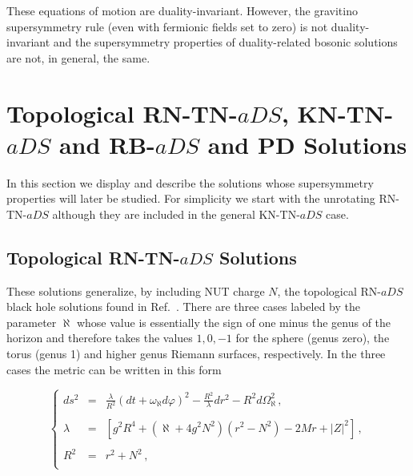 \documentclass[12pt,a4paper]{article}
\begin{document}
These equations of motion are duality-invariant. However, the
gravitino supersymmetry rule (even with fermionic fields set to zero)
is not duality-invariant and the supersymmetry properties of
duality-related bosonic solutions are not, in general, the same.



\section{Topological RN-TN-$aDS$, KN-TN-$aDS$ and 
RB-$aDS$ and PD Solutions}
\label{sec-solutions}

In this section we display and describe the solutions whose
supersymmetry properties will later be studied.  For simplicity we
start with the unrotating RN-TN-$aDS$ although they are included in
the general KN-TN-$aDS$ case.


\subsection{Topological RN-TN-$aDS$ Solutions}

These solutions generalize, by including NUT charge $N$, the
topological RN-$aDS$ black hole solutions found in Ref.~\cite{art:BLP}.
There are three cases labeled by the parameter $\aleph$ whose value is
essentially the sign of one minus the genus of the horizon and
therefore takes the values $1,0,-1$ for the sphere (genus zero), the
torus (genus 1) and higher genus Riemann surfaces, respectively.  In
the three cases the metric can be written in this form

\begin{equation}
\label{eq:RNTNaDS}
\left\{
\begin{array}{rcl}
ds^{2} & = & {\displaystyle\frac{\lambda}{R^{2}}}
\left( dt +\omega_{\aleph}d\varphi\right)^{2}
-{\displaystyle\frac{R^{2}}{\lambda}} dr^{2} 
-R^{2}d\Omega_{\aleph}^{2}\, ,\\
& & \\
\lambda & = & {\displaystyle\left[g^{2}R^{4} 
+(\aleph +4g^{2}N^{2})(r^{2}-N^{2})-2Mr +|Z|^{2}\right]}\, ,\\
& & \\
R^{2} & = & r^{2}+N^{2}\, ,\\
\end{array}
\right.
\end{equation}
\end{document}

